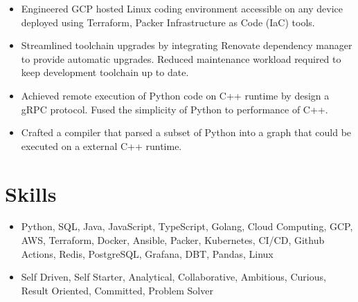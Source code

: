 \begin{itemize}
  \item Engineered GCP hosted Linux coding environment accessible on any device deployed using Terraform,
    Packer Infrastructure as Code (IaC) tools.
  \item Streamlined toolchain upgrades by integrating Renovate dependency manager to provide automatic upgrades. Reduced maintenance workload required to keep development toolchain up to date.
\end{itemize}
\begin{itemize}
\item Achieved remote execution of Python code on C++ runtime by design a gRPC protocol. Fused the simplicity of Python to performance of C++.
\item Crafted a compiler that parsed a subset of Python into a graph that could be executed on a external C++ runtime.
\end{itemize}
  
\section{Skills}
\begin{itemize}
  \item Python, SQL, Java, JavaScript, TypeScript, Golang, Cloud Computing, GCP, AWS, Terraform, Docker, Ansible, Packer, Kubernetes, CI/CD, Github Actions, Redis, PostgreSQL, Grafana, DBT, Pandas, Linux
  \item Self Driven, Self Starter, Analytical, Collaborative, Ambitious, Curious, Result Oriented, Committed, Problem Solver
\end{itemize}
